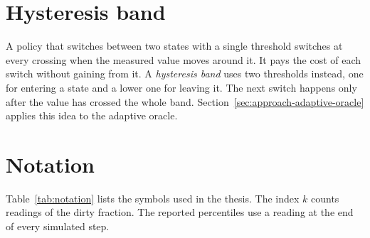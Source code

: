 \section{Hysteresis band}\label{sec:prelim-hysteresis}

A policy that switches between two states with a single threshold switches at
every crossing when the measured value moves around it. It pays the cost of each
switch without gaining from it. A \emph{hysteresis band} uses two thresholds
instead, one for entering a state and a lower one for leaving it. The next
switch happens only after the value has crossed the whole band.
Section~\ref{sec:approach-adaptive-oracle} applies this idea to the adaptive oracle.

\section{Notation}\label{sec:prelim-notation}

Table~\ref{tab:notation} lists the symbols used in the thesis. The index $k$
counts readings of the dirty fraction. The reported percentiles use a reading at
the end of every simulated step.

